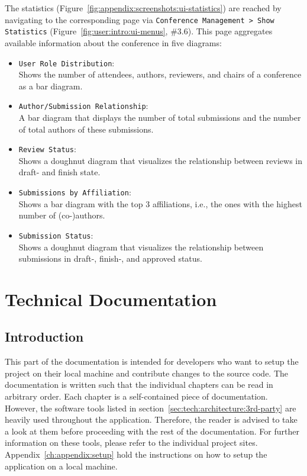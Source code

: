 \documentclass[nochapterpage,nopartpage,noheadingspace,numbersubsubsec,bigchapter,colorback,accentcolor=tud9c,10pt]{tudreport}
\begin{document}
    The statistics (Figure~\ref{fig:appendix:screenshots:ui-statistics}) are reached by navigating to the corresponding page via \texttt{Conference Management > Show Statistics} (Figure~\ref{fig:user:intro:ui-menus}, \#3.6). This page aggregates available information about the conference in five diagrams:
        \begin{itemize}
            \setlength\itemsep{0em}
            \item \texttt{User Role Distribution}:\\
            Shows the number of attendees, authors, reviewers, and chairs of a conference as a bar diagram.
            \item \texttt{Author/Submission Relationship}:\\
            A bar diagram that displays the number of total submissions and the number of total authors of these submissions.
            \item \texttt{Review Status}:\\
            Shows a doughnut diagram that visualizes the relationship between reviews in draft- and finish state.
            \item \texttt{Submissions by Affiliation}:\\
            Shows a bar diagram with the top 3 affiliations, i.e., the ones with the highest number of (co-)authors.
            \item \texttt{Submission Status}:\\
            Shows a doughnut diagram that visualizes the relationship between submissions in draft-, finish-, and approved status.
        \end{itemize}

\part{Technical Documentation}
\label{part:tech}

  \chapter{Introduction}
  \label{ch:tech:intro}

    This part of the documentation is intended for developers who want to setup the project on their local machine and contribute changes to the source code. The documentation is written such that the individual chapters can be read in arbitrary order. Each chapter is a self-contained piece of documentation. However, the software tools listed in section~\ref{sec:tech:architecture:3rd-party} are heavily used throughout the application. Therefore, the reader is advised to take a look at them before proceeding with the rest of the documentation. For further information on these tools, please refer to the individual project sites. Appendix~\ref{ch:appendix:setup} hold the instructions on how to setup the application on a local machine.
\end{document}
